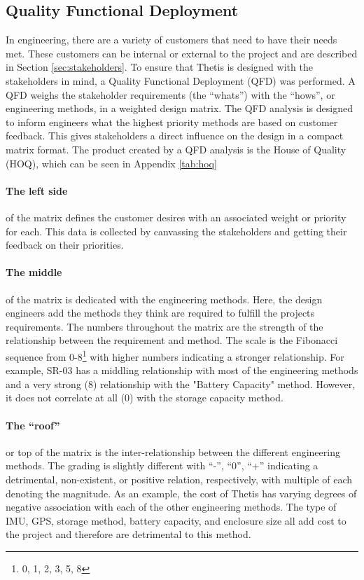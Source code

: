 \begin{landscape}
\end{landscape}

\subsection{Quality Functional Deployment} 
In engineering, there are a variety of customers that need to have their needs met.
These customers can be internal or external to the project and are described in Section \ref{sec:stakeholders}.
To ensure that Thetis is designed with the stakeholders in mind, a Quality Functional Deployment (QFD) was performed.
A QFD weighs the stakeholder requirements (the ``whats'') with the ``hows'', or engineering methods, in a weighted design matrix.
The QFD analysis is designed to inform engineers what the highest priority methods are based on customer feedback.
This gives stakeholders a direct influence on the design in a compact matrix format.
The product created by a QFD analysis is the House of Quality (HOQ), which can be seen in Appendix \ref{tab:hoq}

\paragraph*{The left side} of the matrix defines the customer desires with an associated weight or priority for each.
This data is collected by canvassing the stakeholders and getting their feedback on their priorities.

\paragraph*{The middle} of the matrix is dedicated with the engineering methods.
Here, the design engineers add the methods they think are required to fulfill the projects requirements.
The numbers throughout the matrix are the strength of the relationship between the requirement and method. 
The scale is the Fibonacci sequence from 0-8\footnote{0, 1, 2, 3, 5, 8} with higher numbers indicating a stronger relationship.
For example, SR-03 has a middling relationship with most of the engineering methods and a very strong (8) relationship with the "Battery Capacity" method.
However, it does not correlate at all (0) with the storage capacity method.

\paragraph*{The ``roof''} or top of the matrix is the inter-relationship between the different engineering methods.
The grading is slightly different with ``-'', ``0'', ``+'' indicating a detrimental, non-existent, or positive relation, respectively, with multiple of each denoting the magnitude.
As an example, the cost of Thetis has varying degrees of negative association with each of the other engineering methods.
The type of IMU, GPS, storage method, battery capacity, and enclosure size all add cost to the project and therefore are detrimental to this method.

